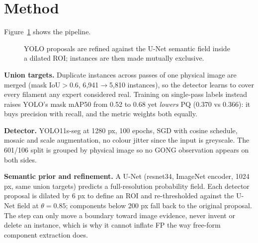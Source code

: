 \documentclass[conference]{IEEEtran}
\begin{document}
\section{Method}
Figure~\ref{fig:pipeline} shows the pipeline. 
\begin{figure}[t]
\centering
{}
\caption{YOLO proposals are refined against the U-Net semantic field inside a dilated ROI; instances are then made mutually exclusive.}
\label{fig:pipeline}
\end{figure}
\textbf{Union targets.} Duplicate instances across passes of one physical image are merged (mask IoU$>$0.6, 6{,}941$\rightarrow$5{,}810 instances), so the detector learns to cover every filament any expert considered real. Training on single-pass labels instead raises YOLO's mask mAP50 from 0.52 to 0.68 yet \emph{lowers} PQ (0.370 vs 0.366): it buys precision with recall, and the metric weights both equally.

\textbf{Detector.} YOLO11s-seg at 1280 px, 100 epochs, SGD with cosine schedule, mosaic and scale augmentation, no colour jitter since the input is greyscale. The 601/106 split is grouped by physical image so no GONG observation appears on both sides.

\textbf{Semantic prior and refinement.} A U-Net (resnet34, ImageNet encoder, 1024 px, same union targets) predicts a full-resolution probability field. Each detector proposal is dilated by 6 px to define an ROI and re-thresholded against the U-Net field at $\theta=0.85$; components below 200 px fall back to the original proposal. The step can only move a boundary toward image evidence, never invent or delete an instance, which is why it cannot inflate FP the way free-form component extraction does.
\end{document}
